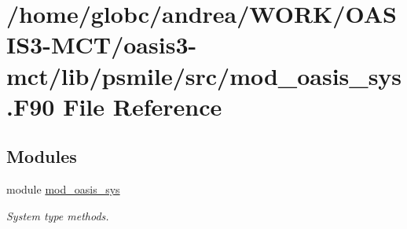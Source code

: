 \hypertarget{mod__oasis__sys_8_f90}{}\section{/home/globc/andrea/\+W\+O\+R\+K/\+O\+A\+S\+I\+S3-\/\+M\+C\+T/oasis3-\/mct/lib/psmile/src/mod\+\_\+oasis\+\_\+sys.F90 File Reference}
\label{mod__oasis__sys_8_f90}
\subsection*{Modules}
\begin{DoxyCompactItemize}
\item 
module \hyperlink{namespacemod__oasis__sys}{mod\+\_\+oasis\+\_\+sys}
\begin{DoxyCompactList}\small\item\em System type methods. \end{DoxyCompactList}\end{DoxyCompactItemize}
